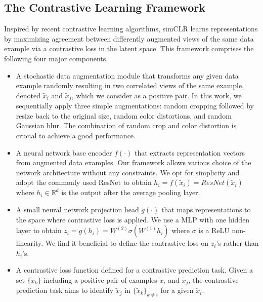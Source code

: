 \documentclass[conference]{IEEEtran}
\begin{document}
\subsection{The Contrastive Learning Framework}
Inspired by recent contrastive learning algorithms, simCLR learns representations by maximizing agreement between differently augmented views of the same data example via a contrastive loss in the latent space.
This framework comprises the following four major components.
\begin{itemize}
    \item A stochastic data augmentation module that transforms any given data example randomly resulting in two correlated views of the same example, denoted $\tilde{x}_i$ and $\tilde{x}_j$, which we consider as a positive pair.
    In this work, we sequentially apply three simple augmentations: random cropping followed by resize back to the original size, random color distortions, and random Gaussian blur. The combination of random crop and color distortion is crucial to achieve a good performance.
    \item A neural network base encoder $f(\cdot)$ that extracts representation vectors from augmented data examples.
    Our framework allows various choice of the network architecture without any constraints. We opt for simplicity and adopt the commonly used ResNet to obtain $h_i = f(\tilde{x}_i) = ResNet(\tilde{x}_i)$ where $h_i \in \mathbb{R}^d$ is the output after the average pooling layer.
    \item A small neural network projection head $g(\cdot)$ that maps representations to the space where contrastive loss is applied. 
    We use a MLP with one hidden layer to obtain $z_i = g(h_i) = W^{(2)}\sigma(W^{(1)}h_i)$ where $\sigma$ is a ReLU non-linearity.
    We find it beneficial to define the contrastive loss on $z_i$'s rather than $h_i$'s.
    \item A contrastive loss function defined for a contrastive prediction task. Given a set $\{\tilde{x}_k\}$ including a positive pair of examples $\tilde{x}_i$ and $\tilde{x}_j$, the contrastive prediction task aims to identify $\tilde{x}_j$ in $\{\tilde{x}_k\}_{k \neq i}$ for a given $\tilde{x}_i$.
\end{itemize}
\end{document}
